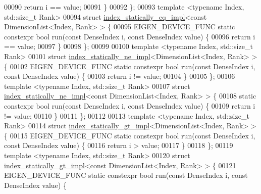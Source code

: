 \begin{DoxyCode}
00090     \textcolor{keywordflow}{return} i == value;
00091   \}
00092 \};
00093 \textcolor{keyword}{template} <\textcolor{keyword}{typename} Index, std::\textcolor{keywordtype}{size\_t} Rank>
00094 \textcolor{keyword}{struct }\hyperlink{struct_eigen_1_1internal_1_1index__statically__eq__impl}{index\_statically\_eq\_impl}<const DimensionList<Index, Rank> > \{
00095   EIGEN\_DEVICE\_FUNC \textcolor{keyword}{static} constexpr \textcolor{keywordtype}{bool} run(\textcolor{keyword}{const} DenseIndex i, \textcolor{keyword}{const} DenseIndex value) \{
00096     \textcolor{keywordflow}{return} i == value;
00097   \}
00098 \};
00099 
00100 \textcolor{keyword}{template} <\textcolor{keyword}{typename} Index, std::\textcolor{keywordtype}{size\_t} Rank>
00101 \textcolor{keyword}{struct }\hyperlink{struct_eigen_1_1internal_1_1index__statically__ne__impl}{index\_statically\_ne\_impl}<DimensionList<Index, Rank> > \{
00102   EIGEN\_DEVICE\_FUNC \textcolor{keyword}{static} constexpr \textcolor{keywordtype}{bool} run(\textcolor{keyword}{const} DenseIndex i, \textcolor{keyword}{const} DenseIndex value) \{
00103     \textcolor{keywordflow}{return} i != value;
00104   \}
00105 \};
00106 \textcolor{keyword}{template} <\textcolor{keyword}{typename} Index, std::\textcolor{keywordtype}{size\_t} Rank>
00107 \textcolor{keyword}{struct }\hyperlink{struct_eigen_1_1internal_1_1index__statically__ne__impl}{index\_statically\_ne\_impl}<const DimensionList<Index, Rank> > \{
00108   \textcolor{keyword}{static} constexpr \textcolor{keywordtype}{bool} run(\textcolor{keyword}{const} DenseIndex i, \textcolor{keyword}{const} DenseIndex value) \{
00109     \textcolor{keywordflow}{return} i != value;
00110   \}
00111 \};
00112 
00113 \textcolor{keyword}{template} <\textcolor{keyword}{typename} Index, std::\textcolor{keywordtype}{size\_t} Rank>
00114 \textcolor{keyword}{struct }\hyperlink{struct_eigen_1_1internal_1_1index__statically__gt__impl}{index\_statically\_gt\_impl}<DimensionList<Index, Rank> > \{
00115   EIGEN\_DEVICE\_FUNC \textcolor{keyword}{static} constexpr \textcolor{keywordtype}{bool} run(\textcolor{keyword}{const} DenseIndex i, \textcolor{keyword}{const} DenseIndex value) \{
00116     \textcolor{keywordflow}{return} i > value;
00117   \}
00118 \};
00119 \textcolor{keyword}{template} <\textcolor{keyword}{typename} Index, std::\textcolor{keywordtype}{size\_t} Rank>
00120 \textcolor{keyword}{struct }\hyperlink{struct_eigen_1_1internal_1_1index__statically__gt__impl}{index\_statically\_gt\_impl}<const DimensionList<Index, Rank> > \{
00121   EIGEN\_DEVICE\_FUNC \textcolor{keyword}{static} constexpr \textcolor{keywordtype}{bool} run(\textcolor{keyword}{const} DenseIndex i, \textcolor{keyword}{const} DenseIndex value) \{

\end{DoxyCode}
